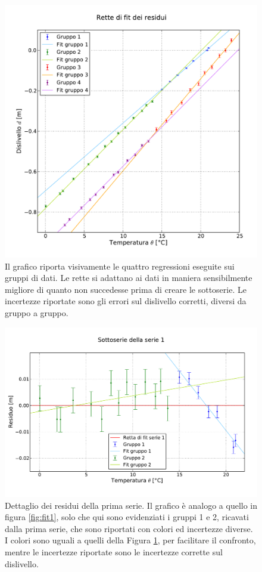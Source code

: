 \begin{figure}
    \centering
    \includegraphics[width=120mm]{immagini/residui.pdf}
    \caption{Il grafico riporta visivamente le quattro regressioni eseguite sui gruppi di dati.
    Le rette si adattano ai dati in maniera sensibilmente migliore di quanto non succedesse prima
    di creare le sottoserie. Le incertezze riportate sono gli errori sul dislivello corretti, diversi
    da gruppo a gruppo. }
    \label{fig:residui}
\end{figure}

\begin{figure}[p]
    \centering
    \includegraphics[width=130mm]{immagini/fit1r.pdf}
    \caption{Dettaglio dei residui della prima serie. Il grafico è analogo a quello in figura \ref{fig:fit1},
    solo che qui sono evidenziati i gruppi 1 e 2, ricavati dalla prima serie, che sono
    riportati con colori ed incertezze diverse. I colori sono uguali a quelli della Figura \ref{fig:residui},
    per facilitare il confronto, mentre le incertezze riportate sono le incertezze corrette sul dislivello.}
    \label{fig:fit1r}
\end{figure}

